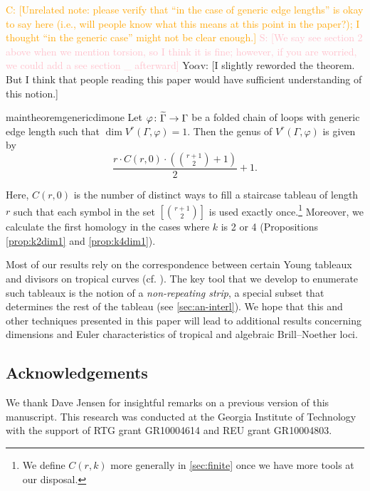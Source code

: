 \documentclass[11pt,reqno]{amsart}
\newcommand*{\maps}{\nobreak\mskip2mu\mathpunct{}\nonscript
  \mkern-\thinmuskip{:}\mskip6muplus1mu\relax}
\newcommand*{\wti}[1]{\widetilde{#1}}
\newcommand{\yoav}[1]{{\color{blue} \sf  Yo$\alpha$v: [#1]}}
\newcommand{\caelan}[1]{\textcolor{orange}{\sf C: [#1]}}
\newcommand{\steven}[1]{\textcolor{pink}{\sf S: [#1]}}
\theoremstyle{definition}
\theoremstyle{problem}
\theoremstyle{plain}
\theoremstyle{remark}
\theoremstyle{theorem}
\numberwithin{equation}{section}
\numberwithin{figure}{section}
\begin{document}
\caelan{Unrelated note: please verify that ``in the case of generic
  edge lengths'' is okay to say here (i.e., will people know what this
  means at this point in the paper?); I thought ``in the generic
  case'' might not be clear enough.}
  \steven{We say see section 2 above when we mention torsion, so I think it is fine; however, if you are worried, we could add a see section \_ afterward} \yoav{I slightly reworded the theorem. But I think that people reading this paper would have sufficient understanding of this notion.}
  
\begin{restatable}{maintheorem}{genericdimone}
  \label{thm:generic-dim-1}
  Let $\varphi\maps\wti\Gamma\to\Gamma$ be a folded chain of loops with generic edge length
  such that $\dim V^r(\Gamma,\varphi)=1$. Then the genus of
  $V^r(\Gamma,\varphi)$ is given by
  \begin{equation}\label{eq:9}
    \frac{r \cdot C(r,0) \cdot (\binom{r+1}{2}+1)}{2} + 1.
  \end{equation}
\end{restatable}
\noindent Here, $C(r,0)$ is the number of distinct ways to fill a
staircase tableau of length $r$ such that each symbol in the set
$[\binom{r+1}{2}]$ is used exactly once.\footnote{We define $C(r,k)$
  more generally in \cref{sec:finite} once we have more tools at our
  disposal.} Moreover, we calculate the first homology in the cases
where $k$ is 2 or 4 (Propositions \ref{prop:k2dim1} and
\ref{prop:k4dim1}).

Most of our results rely on the correspondence between certain Young
tableaux and divisors on tropical curves (cf. \cite{CDPR,
  pflueger2017special}). The key tool that we develop to enumerate
such tableaux is the notion of a \emph{non-repeating strip}, a special
subset that determines the rest of the tableau (see
\cref{sec:an-interl}).  We hope that this and other techniques
presented in this paper will lead to additional results concerning
dimensions and Euler characteristics of tropical and algebraic
Brill--Noether loci.

\subsection*{Acknowledgements} 
We thank Dave Jensen for insightful remarks on a previous version of
this manuscript.  This research was conducted at the Georgia Institute
of Technology with the support of RTG grant GR10004614 and REU grant
GR10004803.
    
\end{document}

